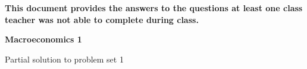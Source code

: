 \documentclass[12pt,a4paper]{article}
\begin{document}
\vspace*{5cm}

\doublespacing \Large \textbf{This document provides the answers to the
questions at least one class teacher was not able to complete during 
class.}
\newpage
\singlespacing

\normalsize

\begin{center}
\textbf{Macroeconomics 1}

Partial solution to problem set 1
\end{center}

\begin{enumerate}








\end{enumerate}
\end{document}
